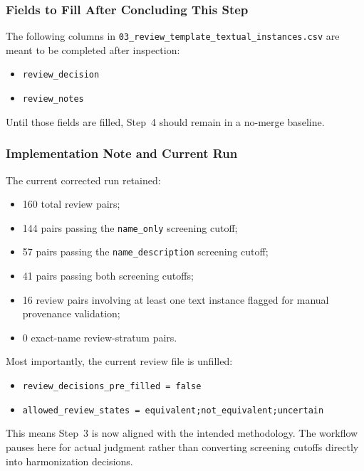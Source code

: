 \subsubsection{Fields to Fill After Concluding This Step}
\label{sec:step3_fields_to_fill}

The following columns in \texttt{03\_review\_template\_textual\_instances.csv} are meant to be completed after inspection:
\begin{itemize}
    \item \texttt{review\_decision}
    \item \texttt{review\_notes}
\end{itemize}

Until those fields are filled, Step~4 should remain in a no-merge baseline.

\subsubsection{Implementation Note and Current Run}
\label{sec:step3_implementation_note}

The current corrected run retained:
\begin{itemize}
    \item 160 total review pairs;
    \item 144 pairs passing the \texttt{name\_only} screening cutoff;
    \item 57 pairs passing the \texttt{name\_description} screening cutoff;
    \item 41 pairs passing both screening cutoffs;
    \item 16 review pairs involving at least one text instance flagged for manual provenance validation;
    \item 0 exact-name review-stratum pairs.
\end{itemize}

Most importantly, the current review file is unfilled:
\begin{itemize}
    \item \texttt{review\_decisions\_pre\_filled = false}
    \item \texttt{allowed\_review\_states = equivalent;not\_equivalent;uncertain}
\end{itemize}

This means Step~3 is now aligned with the intended methodology. The workflow pauses here for actual judgment rather than converting screening cutoffs directly into harmonization decisions.
